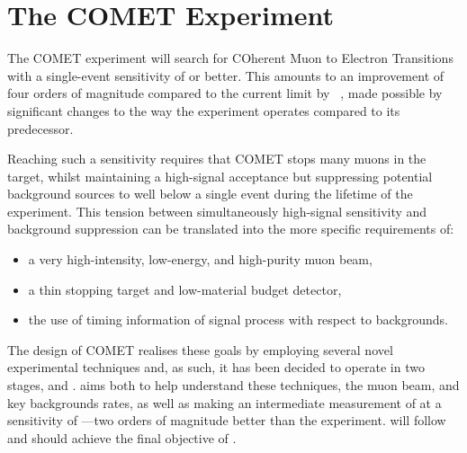 

\chapter{The COMET Experiment}

The COMET experiment will search for COherent Muon to Electron Transitions with a single-event sensitivity of \sensePII or better.
This amounts to an improvement of four orders of magnitude compared to the current limit by \sindrumII~\cite{sindrum2006}, made possible by significant changes to the way the experiment operates compared to its predecessor.

Reaching such a sensitivity requires that COMET stops many muons in the target, whilst maintaining a high-signal acceptance but
suppressing potential background sources to well below a single event during the lifetime of the experiment.
This tension between simultaneously high-signal sensitivity and background suppression can be translated into the more specific requirements of:
\begin{itemize}
\setlength{\itemsep}{-1ex}
\item a very high-intensity, low-energy, and high-purity muon beam,
\item a thin stopping target and low-material budget detector,
\item the use of timing information of signal process with respect to backgrounds.
\end{itemize}

The design of COMET realises these goals by employing several novel experimental techniques and, as such, it has been decided to operate in two stages, \phaseI and \phaseII.
\phaseI aims both to help understand these techniques, the muon beam, and key backgrounds rates, as well as making an intermediate measurement of \mueconv at a sensitivity of \sensePI---two orders of magnitude better than the \sindrumII experiment.
\phaseII will follow and should achieve the final objective of \sensePII. 

